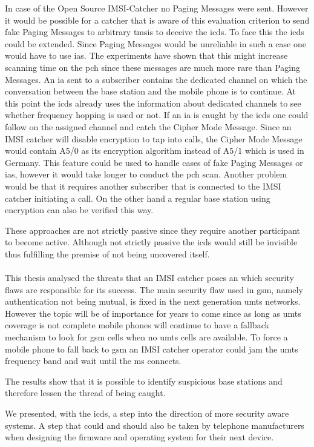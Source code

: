 In case of the Open Source IMSI-Catcher no Paging Messages were sent.
However it would be possible for a catcher that is aware of this evaluation criterion to send fake Paging Messages to arbitrary \glspl{tmsi} to deceive the \gls{icds}.
To face this the \gls{icds} could be extended.
Since Paging Messages would be unreliable in such a case one would have to use \glspl{ia}.
The experiments have shown that this might increase scanning time on the \gls{pch} since these messages are much more rare than Paging Messages.
An \gls{ia} sent to a subscriber contains the dedicated channel on which the conversation between the base station and the mobile phone is to continue.
At this point the \gls{icds} already uses the information about dedicated channels to see whether frequency hopping is used or not.
If an \gls{ia} is caught by the \gls{icds} one could follow on the assigned channel and catch the Cipher Mode Message.
Since an IMSI catcher will disable encryption to tap into calls, the Cipher Mode Message would contain A5/0 as its encryption algorithm instead of A5/1 which is used in Germany.
This feature could be used to handle cases of fake Paging Messages or \glspl{ia}, however it would take longer to conduct the \gls{pch} scan.
Another problem would be that it requires another subscriber that is connected to the IMSI catcher initiating a call.
On the other hand a regular base station using encryption can also be verified this way.

These approaches are not strictly passive since they require another participant to become active.
Although not strictly passive the \gls{icds} would still be invisible thus fulfilling the premise of not being uncovered itself.

\paragraph{}This thesis analysed the threats that an IMSI catcher poses an which security flaws are responsible for its success.
The main security flaw used in \gls{gsm}, namely authentication not being mutual, is fixed in the next generation \gls{umts} networks.
However the topic will be of importance for years to come since as long as \gls{umts} coverage is not complete mobile phones will continue to have a fallback mechanism to look for \gls{gsm} cells when no \gls{umts} cells are available.
To force a mobile phone to fall back to \gls{gsm} an IMSI catcher operator could jam the \gls{umts} frequency band and wait until the \gls{ms} connects.

The results show that it is possible to identify suspicious base stations and therefore lessen the thread of being caught.

We presented, with the \gls{icds}, a step into the direction of more security aware systems.
A step that could and should also be taken by telephone manufacturers when designing the firmware and operating system for their next device.


